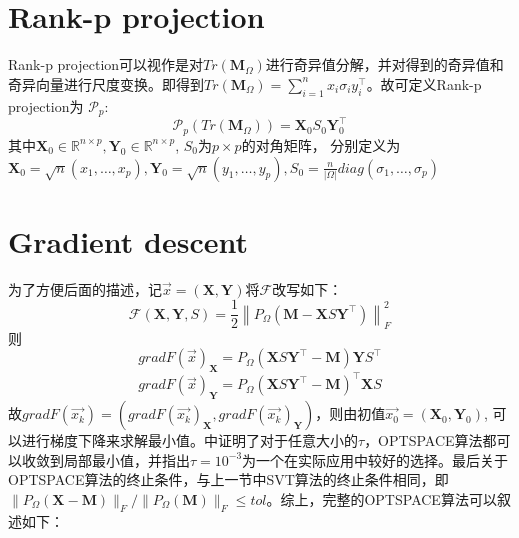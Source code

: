 \section{Rank-p projection}
Rank-p projection可以视作是对$Tr(\mathbf{M}_\Omega)$进行奇异值分解，并对得到的奇异值和奇异向量进行尺度变换。即得到$Tr(\mathbf{M}_\Omega) = \sum_{i=1}^nx_i\sigma_iy_i^\intercal$。故可定义Rank-p projection为
$\mathcal{P}_p$: 
\begin{equation*}
    \mathcal{P}_p(Tr(\mathbf{M}_\Omega)) = \mathbf{X}_0S_0\mathbf{Y}_0^\intercal
\end{equation*}
其中$\mathbf{X}_0\in\mathbb{R}^{n \times p}, \mathbf{Y}_0\in\mathbb{R}^{n\times p}$, $S_0$为$p\times p$的对角矩阵，
分别定义为$\mathbf{X}_0 = \sqrt{n}(x_1,\dots,x_p), \mathbf{Y}_0 = \sqrt{n}(y_1,\dots,y_p), S_0 = \frac{n}{|\Omega|}diag(\sigma_1,\dots,\sigma_p)$

\section{Gradient descent}
为了方便后面的描述，记$\overrightarrow{x} = (\mathbf{X,Y})$将$\mathcal{F}$改写如下：
\begin{equation*}
    \mathcal{F}(\mathbf{X,Y},S) = \frac{1}{2}\left\|P_{\Omega}(\mathbf{M} - \mathbf{X}S\mathbf{Y}^\intercal)\right\|_F^2
\end{equation*}
则
\begin{equation*}
    gradF(\overrightarrow{x})_{\mathbf{X}} = P_\Omega(\mathbf{X}S\mathbf{Y}^\intercal - \mathbf{M})\mathbf{Y}S^\intercal
\end{equation*}
\begin{equation*}
    gradF(\overrightarrow{x})_{\mathbf{Y}} = P_\Omega(\mathbf{X}S\mathbf{Y}^\intercal - \mathbf{M})^\intercal\mathbf{X}S
\end{equation*}
故$gradF(\overrightarrow{x_k}) = (gradF(\overrightarrow{x_k})_{\mathbf{X}},gradF(\overrightarrow{x_k})_{\mathbf{Y}})$，则由初值$\overrightarrow{x_0} = (\mathbf{X}_0,\mathbf{Y}_0)$, 可以进行梯度下降来求解最小值。\cite{armijo1966minimization}中证明了对于任意大小的$\tau$，OPTSPACE算法都可以收敛到局部最小值，并指出$\tau = 10^{-3}$为一个在实际应用中较好的选择。最后关于OPTSPACE算法的终止条件，与上一节中SVT算法的终止条件相同，即$\|P_{\Omega}(\mathbf{X} - \mathbf{M})\|_F/\|P_{\Omega}(\mathbf{M})\|_F \leq tol$。综上，完整的OPTSPACE算法可以叙述如下：

